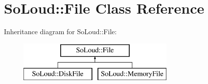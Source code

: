 \hypertarget{class_so_loud_1_1_file}{}\section{So\+Loud\+:\+:File Class Reference}
\label{class_so_loud_1_1_file}
Inheritance diagram for So\+Loud\+:\+:File\+:\begin{figure}[H]
\begin{center}
\leavevmode
\includegraphics[height=2.000000cm]{class_so_loud_1_1_file}
\end{center}
\end{figure}
